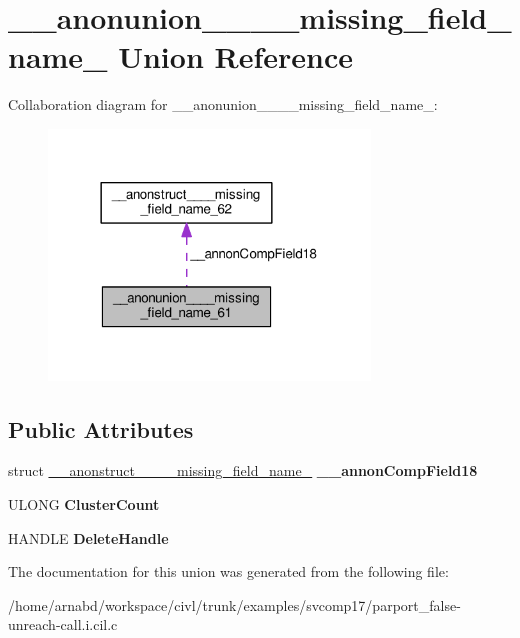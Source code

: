 \hypertarget{union____anonunion________missing__field__name__61}{}\section{\+\_\+\+\_\+anonunion\+\_\+\+\_\+\+\_\+\+\_\+missing\+\_\+field\+\_\+name\+\_ Union Reference}
\label{union____anonunion________missing__field__name__61}


Collaboration diagram for \+\_\+\+\_\+anonunion\+\_\+\+\_\+\+\_\+\+\_\+missing\+\_\+field\+\_\+name\+\_\+:
\nopagebreak
\begin{figure}[H]
\begin{center}
\leavevmode
\includegraphics[width=242pt]{union____anonunion________missing__field__name__61__coll__graph}
\end{center}
\end{figure}
\subsection*{Public Attributes}
\begin{DoxyCompactItemize}
\item 
\hypertarget{union____anonunion________missing__field__name__61_a30079f8236fc7356763bae999bb2dd30}{}struct \hyperlink{struct____anonstruct________missing__field__name__62}{\+\_\+\+\_\+anonstruct\+\_\+\+\_\+\+\_\+\+\_\+missing\+\_\+field\+\_\+name\+\_} {\bfseries \+\_\+\+\_\+annon\+Comp\+Field18}\label{union____anonunion________missing__field__name__61_a30079f8236fc7356763bae999bb2dd30}

\item 
\hypertarget{union____anonunion________missing__field__name__61_ae0f01db9093268ff9d4e0a1f39dc936b}{}U\+L\+O\+N\+G {\bfseries Cluster\+Count}\label{union____anonunion________missing__field__name__61_ae0f01db9093268ff9d4e0a1f39dc936b}

\item 
\hypertarget{union____anonunion________missing__field__name__61_a9dac8d78d624906fab32f32681590dfe}{}H\+A\+N\+D\+L\+E {\bfseries Delete\+Handle}\label{union____anonunion________missing__field__name__61_a9dac8d78d624906fab32f32681590dfe}

\end{DoxyCompactItemize}


The documentation for this union was generated from the following file\+:\begin{DoxyCompactItemize}
\item 
/home/arnabd/workspace/civl/trunk/examples/svcomp17/parport\+\_\+false-\/unreach-\/call.\+i.\+cil.\+c\end{DoxyCompactItemize}

